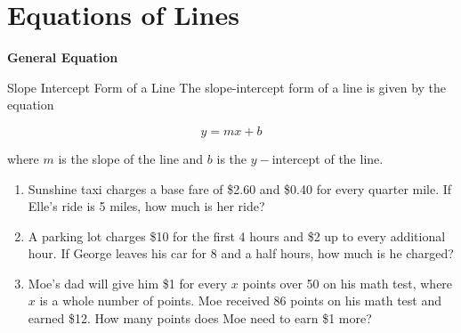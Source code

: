 \section{Equations of Lines}

\bigskip
\textbf{General Equation}

\bigskip
\begin{equationbox}{Slope Intercept Form of a Line}
The slope-intercept form of a line is given by the equation

\[y=mx+b\]

where $m$ is the slope of the line and $b$ is the $y-$intercept of the line.
\end{equationbox}

\bigskip
\begin{enumerate}[labelindent=*,style=multiline,leftmargin=*,label=\textbf{Example \arabic*:}]
\item Sunshine taxi charges a base fare of \$2.60 and \$0.40 for every quarter mile. If Elle's ride is 5 miles, how much is her ride?

\vfill\item A parking lot charges \$10 for the first 4 hours and \$2 up to every additional hour. If George leaves his car for 8 and a half hours, how much is he charged?

\vfill\item Moe's dad will give him \$1 for every $x$ points over 50 on his math test, where $x$ is a whole number of points. Moe received 86 points on his math test and earned \$12. How many points does Moe need to earn \$1 more?
\end{enumerate}

